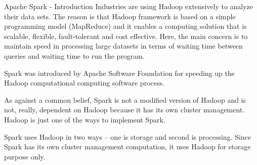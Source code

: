 Apache Spark - Introduction
Industries are using Hadoop extensively to analyze their data sets. The reason is that Hadoop framework is based on a simple programming model (MapReduce) and it enables a computing solution that is scalable, flexible, fault-tolerant and cost effective. Here, the main concern is to maintain speed in processing large datasets in terms of waiting time between queries and waiting time to run the program.

Spark was introduced by Apache Software Foundation for speeding up the Hadoop computational computing software process.

As against a common belief, Spark is not a modified version of Hadoop and is not, really, dependent on Hadoop because it has its own cluster management. Hadoop is just one of the ways to implement Spark.

Spark uses Hadoop in two ways – one is storage and second is processing. Since Spark has its own cluster management computation, it uses Hadoop for storage purpose only.
